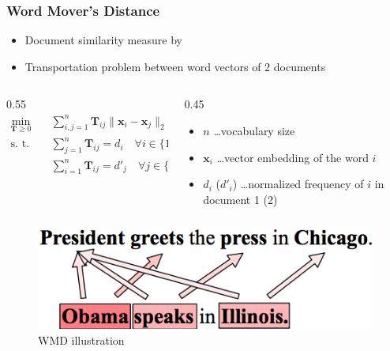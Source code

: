 \documentclass{beamer}
\begin{document}
\begin{frame}[noframenumbering]
\frametitle{Word Mover's Distance}
\begin{itemize}
\item Document similarity measure by \cite{wmd}
\item Transportation problem between word vectors of 2 documents
\end{itemize}

\begin{columns}
\begin{column}{0.55\textwidth}
\small
\begin{equation}
\begin{alignedat}{-1}
\min_{\mathbf{T} \geq 0} & \quad \sum_{i,j = 1}^{n} \mathbf{T}_{ij} \| \mathbf{x}_{i} - \mathbf{x}_{j} \|_{2} \\
\text{s. t.} & \quad \sum_{j=1}^{n} \mathbf{T}_{ij} = d_{i} \quad \forall i \in \{1, \dots, n \} \\
& \quad \sum_{i=1}^{n} \mathbf{T}_{ij} = d'_{j} \quad \forall j \in \{1, \dots, n \}
\end{alignedat}
\end{equation}
\normalsize
\end{column}

\begin{column}{0.45\textwidth}
\begin{itemize}
\item $n$ \dots vocabulary size
\item $\mathbf{x}_{i}$ \dots vector embedding of the word $i$
\item $d_{i}$ ($d'_{i}$) \dots normalized frequency of $i$ in document 1 (2)
\end{itemize}
\end{column}
\end{columns}

\begin{figure}
\centering
\includegraphics[height=0.2\textheight]{wmd_flow}
\caption{WMD illustration}
\end{figure}

\end{frame}
\end{document}
